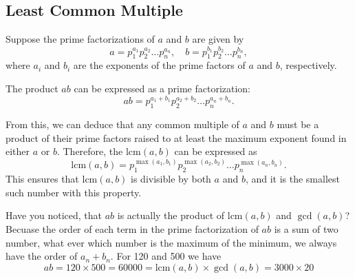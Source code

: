 \documentclass[oneside]{book}
\begin{document}
\subsection{Least Common Multiple}

Suppose the prime factorizations of \(a\) and \(b\) are given by
\[ a = p_1^{a_1} p_2^{a_2} \ldots p_n^{a_n}, \quad b = p_1^{b_1} p_2^{b_2} \ldots p_n^{b_n}, \]
where \(a_i\) and \(b_i\) are the exponents of the prime factors of \(a\) and \(b\), respectively.

The product \(ab\) can be expressed as a prime factorization:
\[ ab = p_1^{a_1+b_1} p_2^{a_2+b_2} \ldots p_n^{a_n+b_n}. \]

From this, we can deduce that any common multiple of \(a\) and \(b\) must be a product of their prime factors raised to at least the maximum exponent found in either \(a\) or \(b\). Therefore, the \(\text{lcm}(a, b)\) can be expressed as
\[ \text{lcm}(a, b) = p_1^{\max(a_1,b_1)} p_2^{\max(a_2,b_2)} \ldots p_n^{\max(a_n,b_n)}. \]
This ensures that \(\text{lcm}(a, b)\) is divisible by both \(a\) and \(b\), and it is the smallest such number with this property.



Have you noticed, that $ab$ is actually the product of $\text{lcm}(a,b)$ and $\gcd(a,b)$? Becuase the order of each
term in the prime factorization of $ab$ is a sum of two number, what ever which number is the maximum of the minimum,
we always have the order of $a_n+b_n$. For 120 and 500 we have
$$ab = 120\times 500 = 60000 = \text{lcm}(a,b)\times \gcd(a,b) = 3000\times 20$$

\end{document}
